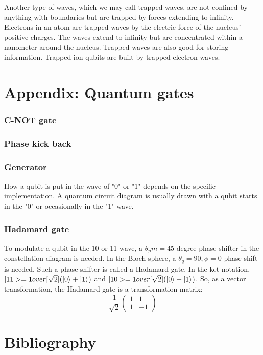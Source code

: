 \documentclass[Letter,11pt]{book}
\begin{document}
Another type of waves, which we may call trapped waves, are not confined by anything with boundaries but are trapped by forces extending to infinity. Electrons in an atom are trapped waves by the electric force of the nucleus' positive charges. The waves extend to infinity but are concentrated within a nanometer around the nucleus. Trapped waves are also good for storing information. Trapped-ion qubits are built by trapped electron waves.

\chapter{Appendix: Quantum gates}

\subsection{C-NOT gate}
\subsection{Phase kick back}

\subsection{Generator}
How a qubit is put in the wave of "0" or "1" depends on the specific implementation. A quantum circuit diagram is usually drawn with a qubit starts in the "0" or occasionally in the "1" wave.

\subsection{Hadamard gate}
To modulate a qubit in the 10 or 11 wave, a $\theta_pm = 45$ degree phase shifter in the constellation diagram is needed. In the Bloch sphere, a $\theta_q =90, \phi=0$ phase shift is needed. Such a phase shifter is called a Hadamard gate. In the ket notation, $|11> = 1 over [\sqrt 2] (\vert {0} \rangle_{} + \vert {1} \rangle_{})$ and $|10> = 1 over [\sqrt 2] (\vert {0} \rangle_{} - \vert {1} \rangle_{})$. So, as a vector transformation, the Hadamard gate is a transformation matrix:
\begin{equation}
    \frac 1 {\sqrt 2}
    \begin{pmatrix}
1 & 1 \\
1 & -1
\end{pmatrix}
\end{equation}



\chapter*{Bibliography}

   

\printindex
\end{document}
